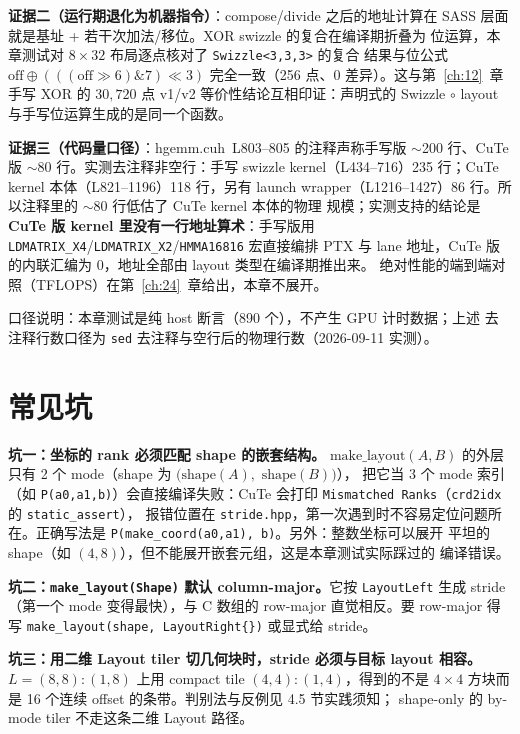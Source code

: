 \textbf{证据二（运行期退化为机器指令）}：compose/divide 之后的地址计算在
SASS 层面就是基址 + 若干次加法/移位。XOR swizzle 的复合在编译期折叠为
位运算，本章测试对 $8\times32$ 布局逐点核对了 \texttt{Swizzle\allowbreak{}<3,\allowbreak{}3,\allowbreak{}3>} 的复合
结果与位公式 $\mathrm{off}\oplus(((\mathrm{off}\gg6)\mathbin{\&}7)\ll3)$
完全一致（256 点、0 差异）。这与第~\ref{ch:12}~章手写 XOR 的
$30{,}720$ 点 v1/v2 等价性结论互相印证：声明式的 Swizzle $\circ$ layout
与手写位运算生成的是同一个函数。

\textbf{证据三（代码量口径）}：hgemm.cuh~L803--805 的注释声称手写版
$\sim$200 行、CuTe 版 $\sim$80 行。实测去注释非空行：手写 swizzle
kernel（L434--716）235 行；CuTe kernel 本体（L821--1196）118 行，另有 launch
wrapper（L1216--1427）86 行。所以注释里的 $\sim$80 行低估了 CuTe kernel 本体的物理
规模；实测支持的结论是\textbf{CuTe 版 kernel 里没有一行地址算术}：手写版用
\texttt{LDMATRIX\_X4}/\texttt{LDMATRIX\_X2}/\texttt{HMMA16816} 宏直接编排 PTX
与 lane 地址，CuTe 版的内联汇编为 0，地址全部由 layout 类型在编译期推出来。
绝对性能的端到端对照（TFLOPS）在第~\ref{ch:24}~章给出，本章不展开。

口径说明：本章测试是纯 host 断言（890 个），不产生 GPU 计时数据；上述
去注释行数口径为 \texttt{sed} 去注释与空行后的物理行数（2026-09-11 实测）。

\section{常见坑}

\textbf{坑一：坐标的 rank 必须匹配 shape 的嵌套结构。}
$\mathrm{make\_layout}(A,B)$ 的外层只有 2 个 mode（shape 为
$\bigl(\mathrm{shape}(A),$ $\mathrm{shape}(B)\bigr)$），
把它当 3 个 mode 索引
（如 \texttt{P(a0,a1,b)}）会直接编译失败：CuTe 会打印
\texttt{Mismatched Ranks}（\texttt{crd2idx} 的 \texttt{static\_\allowbreak{}assert}），
报错位置在 \texttt{stride.hpp}，第一次遇到时不容易定位问题所在。正确写法是
\texttt{P\allowbreak{}(make\_\allowbreak{}coord}\allowbreak\texttt{(a0,a1), b)}。另外：整数坐标可以展开
平坦的 shape（如 $(4,8)$），但不能展开嵌套元组，这是本章测试实际踩过的
编译错误。

\textbf{坑二：\texttt{make\_\allowbreak{}layout\allowbreak{}(Shape)} 默认 column-major。}它按
\texttt{LayoutLeft} 生成 stride（第一个 mode 变得最快），与 C 数组的
row-major 直觉相反。要 row-major 得写 \texttt{make\_\allowbreak{}layout\allowbreak{}(shape,\allowbreak{}
Layout\allowbreak{}Right\{\})} 或显式给 stride。

\textbf{坑三：用二维 Layout tiler 切几何块时，stride 必须与目标 layout 相容。}
$L=(8,8){:}(1,8)$ 上用 compact tile $(4,4){:}(1,4)$，得到的不是 $4\times4$
方块而是 16 个连续 offset 的条带。判别法与反例见 4.5 节实践须知；
shape-only 的 by-mode tiler 不走这条二维 Layout 路径。

